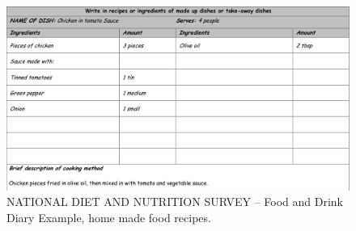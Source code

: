 \begin{figure}[H]
\centering
\includegraphics{Figures/Diary3.png}
\decoRule
\caption[Food diary example of home made food recipes]{NATIONAL DIET AND NUTRITION SURVEY -- Food and Drink Diary Example, home made food recipes.}
\label{fig:diary3}
\end{figure}
